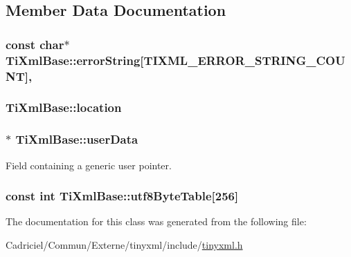 \subsection{Member Data Documentation}
\hypertarget{class_ti_xml_base_aea4b8bd0d25d5de9174c1ed5ea106dff}{
\subsubsection[{error\-String}]{\setlength{\rightskip}{0pt plus 5cm}const char$\ast$ Ti\-Xml\-Base\-::error\-String\mbox{[}{\bf T\-I\-X\-M\-L\-\_\-\-E\-R\-R\-O\-R\-\_\-\-S\-T\-R\-I\-N\-G\-\_\-\-C\-O\-U\-N\-T}\mbox{]}\hspace{0.3cm}{\ttfamily [static]}, {\ttfamily [protected]}}}\label{class_ti_xml_base_aea4b8bd0d25d5de9174c1ed5ea106dff}
\hypertarget{class_ti_xml_base_a0d992580f3bc264909f898e942677a3c}{
\subsubsection[{location}]{ Ti\-Xml\-Base\-::location\hspace{0.3cm}{\ttfamily [protected]}}}\label{class_ti_xml_base_a0d992580f3bc264909f898e942677a3c}
\hypertarget{class_ti_xml_base_ab242c01590191f644569fa89a080d97c}{
\subsubsection[{user\-Data}]{$\ast$ Ti\-Xml\-Base\-::user\-Data\hspace{0.3cm}{\ttfamily [protected]}}}\label{class_ti_xml_base_ab242c01590191f644569fa89a080d97c}


Field containing a generic user pointer. 

\hypertarget{class_ti_xml_base_a727583b4ed4342a3ad78cdc39b819af4}{
\subsubsection[{utf8\-Byte\-Table}]{\setlength{\rightskip}{0pt plus 5cm}const {\bf int} Ti\-Xml\-Base\-::utf8\-Byte\-Table\mbox{[}256\mbox{]}\hspace{0.3cm}{\ttfamily [static]}}}\label{class_ti_xml_base_a727583b4ed4342a3ad78cdc39b819af4}


The documentation for this class was generated from the following file\-:\begin{DoxyCompactItemize}
\item 
Cadriciel/\-Commun/\-Externe/tinyxml/include/\hyperlink{tinyxml_8h}{tinyxml.\-h}\end{DoxyCompactItemize}
